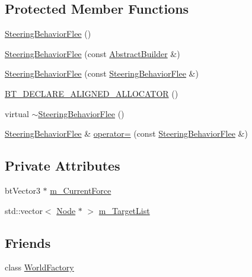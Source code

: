 \subsection*{Protected Member Functions}
\begin{DoxyCompactItemize}
\item 
\mbox{\hyperlink{classnjli_1_1_steering_behavior_flee_a5977ff3cda247a544371d09f56bfa11e}{Steering\+Behavior\+Flee}} ()
\item 
\mbox{\hyperlink{classnjli_1_1_steering_behavior_flee_abb0ec9839afe1503af5375fd9d4bd451}{Steering\+Behavior\+Flee}} (const \mbox{\hyperlink{classnjli_1_1_abstract_builder}{Abstract\+Builder}} \&)
\item 
\mbox{\hyperlink{classnjli_1_1_steering_behavior_flee_a1b4463554e3402c58628c5bbd5236f44}{Steering\+Behavior\+Flee}} (const \mbox{\hyperlink{classnjli_1_1_steering_behavior_flee}{Steering\+Behavior\+Flee}} \&)
\item 
\mbox{\hyperlink{classnjli_1_1_steering_behavior_flee_abb83f4c793fc3e70f91f8bbb231c929a}{B\+T\+\_\+\+D\+E\+C\+L\+A\+R\+E\+\_\+\+A\+L\+I\+G\+N\+E\+D\+\_\+\+A\+L\+L\+O\+C\+A\+T\+OR}} ()
\item 
virtual \mbox{\hyperlink{classnjli_1_1_steering_behavior_flee_acb158cd4ac7a344310ce662e3b58a104}{$\sim$\+Steering\+Behavior\+Flee}} ()
\item 
\mbox{\hyperlink{classnjli_1_1_steering_behavior_flee}{Steering\+Behavior\+Flee}} \& \mbox{\hyperlink{classnjli_1_1_steering_behavior_flee_ace2e73d385a86278017967e7ab92762b}{operator=}} (const \mbox{\hyperlink{classnjli_1_1_steering_behavior_flee}{Steering\+Behavior\+Flee}} \&)
\end{DoxyCompactItemize}
\subsection*{Private Attributes}
\begin{DoxyCompactItemize}
\item 
bt\+Vector3 $\ast$ \mbox{\hyperlink{classnjli_1_1_steering_behavior_flee_a5ea5afe63778f21ef7039f91fee2cdad}{m\+\_\+\+Current\+Force}}
\item 
std\+::vector$<$ \mbox{\hyperlink{classnjli_1_1_node}{Node}} $\ast$ $>$ \mbox{\hyperlink{classnjli_1_1_steering_behavior_flee_afd424808278925f423752d3ce2e7a13e}{m\+\_\+\+Target\+List}}
\end{DoxyCompactItemize}
\subsection*{Friends}
\begin{DoxyCompactItemize}
\item 
class \mbox{\hyperlink{classnjli_1_1_steering_behavior_flee_acb96ebb09abe8f2a37a915a842babfac}{World\+Factory}}
\end{DoxyCompactItemize}

